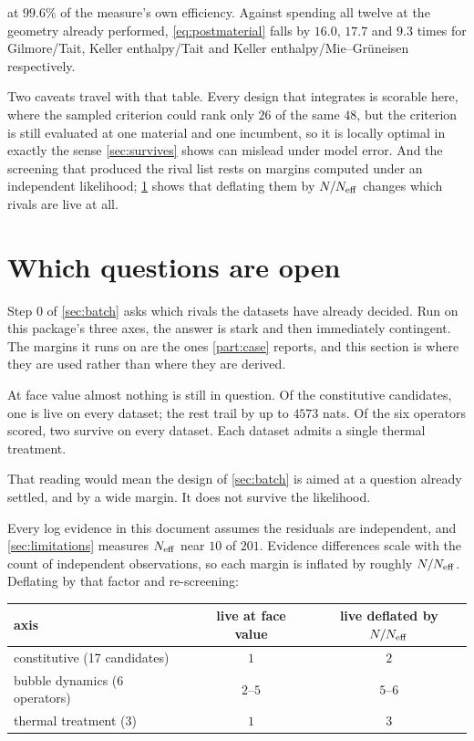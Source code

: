 \documentclass[10pt]{article}
\begin{document}
\noindent at $99.6\%$ of the measure's own efficiency. Against spending all twelve at the
geometry already performed, \eqref{eq:postmaterial} falls by $16.0$, $17.7$ and $9.3$ times for
Gilmore/Tait, Keller enthalpy/Tait and Keller enthalpy/Mie--Gr\"uneisen respectively.

Two caveats travel with that table. Every design that integrates is scorable here, where the
sampled criterion could rank only $26$ of the same $48$, but the criterion is still
evaluated at one material and one incumbent, so it is locally optimal in exactly the sense
\cref{sec:survives} shows can mislead under model error. And the screening that produced the
rival list rests on margins computed under an independent likelihood; \cref{sec:screening}
shows that deflating them by $N/N_{\rm eff}$ changes which rivals are live at all.

\section{Which questions are open}
\label{sec:screening}

Step 0 of \cref{sec:batch} asks which rivals the datasets have already decided. Run on this
package's three axes, the answer is stark and then immediately contingent. The margins it runs
on are the ones \cref{part:case} reports, and this section is where they are used rather than
where they are derived.

At face value almost nothing is still in question. Of the constitutive candidates, one
is live on every dataset; the rest trail by up to $4573$ nats. Of the six operators scored, two
survive on every dataset. Each dataset admits a single thermal treatment.

That reading would mean the design of \cref{sec:batch} is aimed at a question already settled,
and by a wide margin. It does not survive the likelihood.

Every log evidence in this document assumes the residuals are independent, and
\cref{sec:limitations} measures $N_{\rm eff}$ near $10$ of $201$. Evidence differences scale
with the count of independent observations, so each margin is inflated by roughly
$N/N_{\rm eff}$. Deflating by that factor and re-screening:

\begin{center}
\begin{tabular}{lcc}
\toprule
axis & live at face value & live deflated by $N/N_{\rm eff}$ \\
\midrule
constitutive (17 candidates) & $1$ & $2$ \\
bubble dynamics (6 operators) & $2$--$5$ & $5$--$6$ \\
thermal treatment (3) & $1$ & $3$ \\
\bottomrule
\end{tabular}
\end{center}
\end{document}

